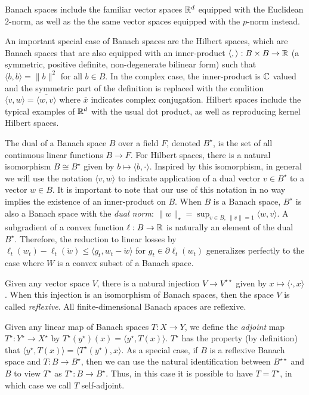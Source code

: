 \documentclass[12pt]{colt2018} %
\newcommand{\w}{\mathring{w}}
\begin{document}
Banach spaces include the familiar vector spaces $\mathbb{R}^d$ equipped with the Euclidean $2$-norm, as well as the the same vector spaces equipped with the $p$-norm instead.

An important special case of Banach spaces are the Hilbert spaces, which are Banach spaces that are also equipped with an inner-product $\langle,\rangle:B\times B\to\mathbb{R}$ (a symmetric, positive definite, non-degenerate bilinear form) such that $\langle b, b\rangle = \|b\|^2$ for all $b\in B$. In the complex case, the inner-product is $\mathbb{C}$ valued and the symmetric part of the definition is replaced with the condition $\langle v, w\rangle = \overline{\langle w, v\rangle}$ where $\overline{x}$ indicates complex conjugation. Hilbert spaces include the typical examples of $\mathbb{R}^d$ with the usual dot product, as well as reproducing kernel Hilbert spaces.

The dual of a Banach space $B$ over a field $F$, denoted $B^\star$, is the set of all continuous linear functions $B\to F$. For Hilbert spaces, there is a natural isomorphism $B\cong B^\star$ given by $b\mapsto \langle b,\cdot\rangle$. Inspired by this isomorphism, in general we will use the notation $\langle v, w\rangle$ to indicate application of a dual vector $v\in B^\star$ to a vector $w\in B$. It is important to note that our use of this notation in no way implies the existence of an inner-product on $B$. When $B$ is a Banach space, $B^\star$ is also a Banach space with the \emph{dual norm}: $\|w\|_\star=\sup_{v\in B,\ \|v\|=1}\langle w, v\rangle$. A subgradient of a convex function $\ell:B\to \mathbb{R}$ is naturally an element of the dual $B^\star$. Therefore, the reduction to linear losses by $\ell_t(w_t)-\ell_t(\w)\le \langle g_t,w_t-\w\rangle$ for $g_t\in \partial \ell_t(w_t)$ generalizes perfectly to the case where $W$ is a convex subset of a Banach space.

Given any vector space $V$, there is a natural injection $V\to V^{\star\star}$ given by $x\mapsto \langle\cdot,x\rangle$. When this injection is an isomorphism of Banach spaces, then the space $V$ is called \emph{reflexive}. All finite-dimensional Banach spaces are reflexive.

Given any linear map of Banach spaces $T:X\to Y$, we define the \emph{adjoint} map $T^\star:Y^\star\to X^\star$ by $T^\star(y^\star)(x) = \langle y^\star, T(x)\rangle$. $T^\star$ has the property (by definition) that $\langle y^\star, T(x)\rangle = \langle T^\star(y^\star), x\rangle$. As a special case, if $B$ is a reflexive Banach space and $T:B\to B^\star$, then we can use the natural identification between $B^{\star\star}$ and $B$ to view $T^\star$ as $T^\star:B\to B^\star$. Thus, in this case it is possible to have $T=T^\star$, in which case we call $T$ self-adjoint.
\end{document}
